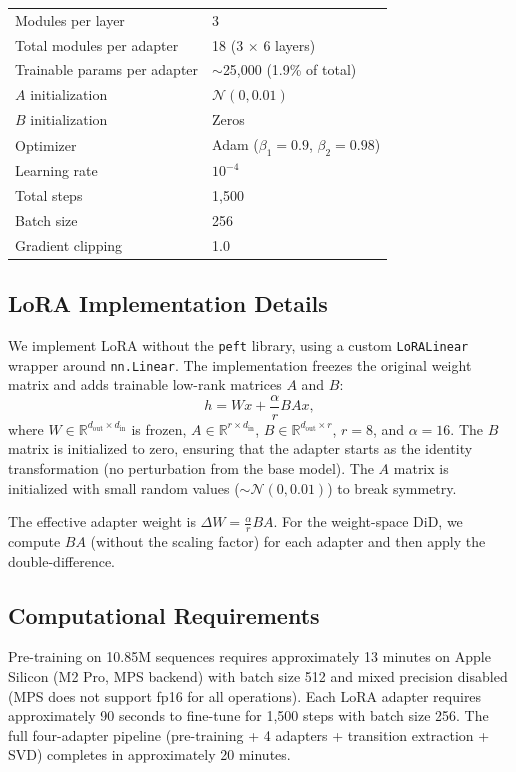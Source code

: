 \documentclass[12pt]{article}
\newcommand{\RR}{\mathbb{R}}
\begin{document}
\begin{table}[H]
\begin{tabular}{ll}
Modules per layer & 3 \\
Total modules per adapter & 18 (3 $\times$ 6 layers) \\
Trainable params per adapter & $\sim$25,000 (1.9\% of total) \\
$A$ initialization & $\mathcal{N}(0, 0.01)$ \\
$B$ initialization & Zeros \\
Optimizer & Adam ($\beta_1=0.9$, $\beta_2=0.98$) \\
Learning rate & $10^{-4}$ \\
Total steps & 1,500 \\
Batch size & 256 \\
Gradient clipping & 1.0 \\
\bottomrule
\end{tabular}
\end{table}

\subsection{LoRA Implementation Details}

We implement LoRA without the \texttt{peft} library, using a custom \texttt{LoRALinear} wrapper around \texttt{nn.Linear}. The implementation freezes the original weight matrix and adds trainable low-rank matrices $A$ and $B$:
\begin{equation}
h = Wx + \frac{\alpha}{r} B A x,
\end{equation}
where $W \in \RR^{d_{\text{out}} \times d_{\text{in}}}$ is frozen, $A \in \RR^{r \times d_{\text{in}}}$, $B \in \RR^{d_{\text{out}} \times r}$, $r = 8$, and $\alpha = 16$. The $B$ matrix is initialized to zero, ensuring that the adapter starts as the identity transformation (no perturbation from the base model). The $A$ matrix is initialized with small random values ($\sim \mathcal{N}(0, 0.01)$) to break symmetry.

The effective adapter weight is $\Delta W = \frac{\alpha}{r} B A$. For the weight-space DiD, we compute $B A$ (without the scaling factor) for each adapter and then apply the double-difference.

\subsection{Computational Requirements}

Pre-training on 10.85M sequences requires approximately 13 minutes on Apple Silicon (M2 Pro, MPS backend) with batch size 512 and mixed precision disabled (MPS does not support fp16 for all operations). Each LoRA adapter requires approximately 90 seconds to fine-tune for 1,500 steps with batch size 256. The full four-adapter pipeline (pre-training + 4 adapters + transition extraction + SVD) completes in approximately 20 minutes.
\end{document}
